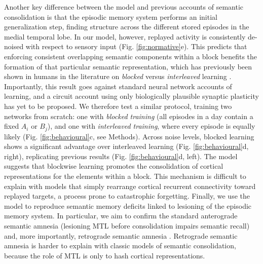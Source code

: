 \documentclass{article}
\begin{document}
Another key difference between the model and previous accounts of semantic consolidation is that the episodic memory system performs an initial generalization step, finding structure across the different stored episodes in the medial temporal lobe. In our model, however, replayed activity is consistently de-noised with respect to sensory input (Fig. \ref{fig:normative}e). This predicts that enforcing consistent overlapping semantic components within a block benefits the formation of that particular semantic representation, which has previously been shown in humans in the literature on \textit{blocked} versus \textit{interleaved} learning . Importantly, this result goes against standard neural network accounts of learning, and a circuit account using only biologically plausible synaptic plasticity has yet to be proposed. We therefore test a similar protocol, training two networks from scratch: one with \textit{blocked training} (all episodes in a day contain a fixed $A_i$ or $B_j$), and one with \textit{interleaved training}, where every episode is equally likely (Fig. \ref{fig:behavioural}c, see Methods). Across noise levels, blocked learning shows a significant advantage over interleaved learning (Fig. \ref{fig:behavioural}d, right), replicating previous results (Fig. \ref{fig:behavioural}d, left). The model suggests that blockwise learning promotes the consolidation of cortical representations for the elements within a block. This mechanism is difficult to explain with models that simply rearrange cortical recurrent connectivity toward replayed targets, a process prone to catastrophic forgetting.
\newline\newline
Finally, we use the model to reproduce semantic memory deficits linked to lesioning of the episodic memory system. In particular, we aim to confirm the standard anterograde semantic amnesia (lesioning MTL before consolidation impairs semantic recall) and, more importantly, retrograde semantic amnesia . Retrograde semantic amnesia is harder to explain with classic models of semantic consolidation, because the role of MTL is only to hash cortical representations.
\newline\newline
\end{document}
